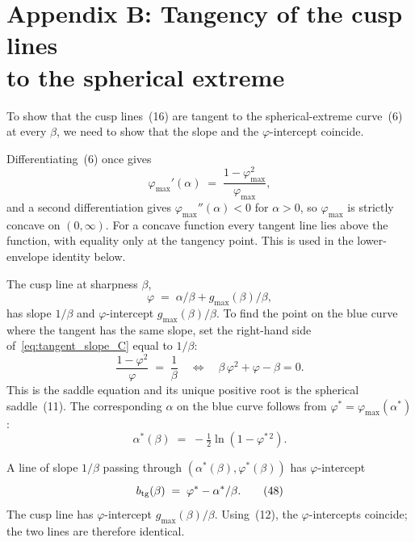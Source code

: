 \documentclass[letterpaper]{article} %
\newcommand{\Bnet}{\beta}
\begin{document}
\section{Appendix B: Tangency of the cusp lines \\to the spherical extreme}

To show that the cusp lines~(16) are tangent to the
spherical-extreme curve~(6) at every
$\Bnet$, we need to show that the slope and the $\varphi$-intercept
coincide.

Differentiating~(6) once gives
\begin{equation}
\varphi_{\max}'(\alpha) \;=\; \frac{1-\varphi_{\max}^2}{\varphi_{\max}},
\tag{44}
\label{eq:tangent_slope_C}
\end{equation}
and a second differentiation gives $\varphi_{\max}''(\alpha) < 0$ for $\alpha > 0$,
so $\varphi_{\max}$ is strictly concave on $(0, \infty)$. For a concave function
every tangent line lies above the function, with equality only at the tangency
point. This is used in the lower-envelope identity below.

The cusp line at sharpness $\Bnet$,
\begin{equation}
\varphi \;=\; \alpha/\Bnet + g_{\max}(\Bnet)/\Bnet,
\tag{45}
\end{equation}
has slope $1/\Bnet$ and $\varphi$-intercept $g_{\max}(\Bnet)/\Bnet$. To find the point on
the blue curve where the tangent has the same slope, set the right-hand side
of~\eqref{eq:tangent_slope_C} equal to $1/\Bnet$:
\begin{equation}
\frac{1-\varphi^2}{\varphi} \;=\; \frac{1}{\Bnet}
\quad\Longleftrightarrow\quad
\Bnet\,\varphi^2 + \varphi - \Bnet = 0.
\tag{46}
\label{eq:saddle_eq_C}
\end{equation}
This is the saddle equation and its unique positive root is the spherical saddle~(11).
The corresponding $\alpha$ on the blue curve follows from
$\varphi^* = \varphi_{\max}(\alpha^*)$:
\begin{equation}
\alpha^*(\Bnet) \;=\; -\tfrac12 \ln(1-\varphi^{*\,2}).
\tag{47}
\label{eq:alpha_star_C}
\end{equation}

A line of slope $1/\Bnet$ passing through $(\alpha^*(\Bnet), \varphi^*(\Bnet))$ has
$\varphi$-intercept
\begin{equation}
b_{\rm tg}(\Bnet) \;=\; \varphi^* - \alpha^*/\Bnet.
\tag{48}
\end{equation}
The cusp line has $\varphi$-intercept $g_{\max}(\Bnet)/\Bnet$.
Using~(12), the $\varphi$-intercepts coincide;
the two lines are therefore identical.
\end{document}
